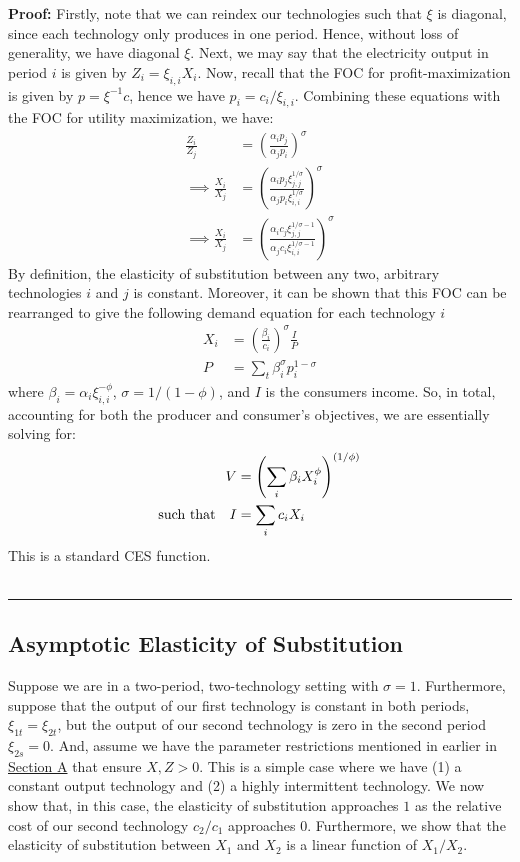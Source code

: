 \documentclass[11pt,a4paper]{extarticle}
\newenvironment{proof}[1][Proof]{\noindent\textbf{#1:} }{\ \rule{0.5em}{0.5em}}
\begin{document}
\begin{proof}
	Firstly, note that we can reindex our technologies such that $\xi$ is diagonal, since each technology only produces in one period. Hence, without loss of generality, we have diagonal $\xi$. Next, we may say that the electricity output in period $i$ is given by $Z_i = \xi_{i,i} X_i$. Now, recall that the FOC for profit-maximization is given by $p = \xi^{-1} c$, hence we have $p_i = c_i / \xi_{i,i}$.  Combining these equations with the FOC for utility maximization, we have:
	\begin{align*}
	\frac{Z_i}{Z_j} &= \left( \frac{\alpha_i p_j}{\alpha_j p_i} \right)^\sigma \\
	\implies \frac{ X_i }{X_j} &= \left( \frac{ \alpha_i p_j \xi_{j,j}^{1/\sigma} }{ \alpha_j p_i \xi_{i,i}^{1/\sigma} } \right)^\sigma \\
	\implies \frac{ X_i }{X_j} &= \left( \frac{ \alpha_i c_j \xi_{j,j}^{1/\sigma - 1} }{ \alpha_j c_i \xi_{i,i}^{1/\sigma - 1} } \right)^\sigma
	\end{align*}
	By definition, the elasticity of substitution between any two, arbitrary technologies $i$ and $j$ is constant. Moreover, it can be shown that this FOC can be rearranged to give the following demand equation for each technology $i$
	\begin{align}
	X_i &= \left(\frac{\beta_i}{c_i} \right)^\sigma \frac{I}{P} \\
	P &= \sum_t \beta_i^\sigma p_i^{1-\sigma}
	\end{align}
	where $\beta_i = \alpha_i \xi_{i,i}^{-\phi}$, $\sigma = 1 / (1-\phi)$, and $I$ is the consumers income.	So, in total, accounting for both the producer and consumer's objectives, we are essentially solving for: 
	\begin{align*} 
	V &= \left( \sum_i \beta_i X_i^\phi \right)^{(1/\phi)}  \\
	\text{such that\quad} I &= \sum_i c_i X_i 
	\end{align*}
	This is a standard CES function.
	\\ \hfill
\end{proof}

\subsection{Asymptotic Elasticity of Substitution}

\label{sec:asympeos}

Suppose we are in a two-period, two-technology setting with $\sigma = 1$. Furthermore, suppose that the output of our first technology is constant in both periods, $\xi_{1t} = \xi_{2t}$, but the output of our second technology is zero in the second period $\xi_{2s} = 0$. And, assume we have the parameter restrictions mentioned in earlier in \hyperref[sec:cobbdoug]{Section A} that ensure $X, Z > 0$. This is a simple case where we have (1) a constant output technology and (2) a highly intermittent technology. We now show that, in this case, the elasticity of substitution approaches $1$ as the relative cost of our second technology $c_2/c_1$ approaches $0$. Furthermore, we show that the elasticity of substitution between $X_1$ and $X_2$ is a linear function of $X_1/X_2$.  
\end{document}
